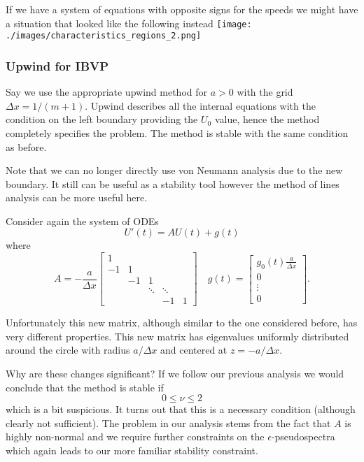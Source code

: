 \documentclass[11pt]{article}
\makeatletter
\def\maxwidth{\ifdim\Gin@nat@width>\linewidth\linewidth
    \else\Gin@nat@width\fi}
\let\Oldincludegraphics\includegraphics
\renewcommand{\includegraphics}[1]{\Oldincludegraphics[width=.8\maxwidth]{#1}}
\makeatother
\begin{document}
    If we have a system of equations with opposite signs for the speeds we
might have a situation that looked like the following instead
\texttt{[image: ./images/characteristics\_regions\_2.png]}

    \hypertarget{upwind-for-ibvp}{%
\subsubsection{Upwind for IBVP}\label{upwind-for-ibvp}}

Say we use the appropriate upwind method for \(a > 0\) with the grid
\(\Delta x = 1 / (m + 1)\). Upwind describes all the internal equations
with the condition on the left boundary providing the \(U_0\) value,
hence the method completely specifies the problem. The method is stable
with the same condition as before.

Note that we can no longer directly use von Neumann analysis due to the
new boundary. It still can be useful as a stability tool however the
method of lines analysis can be more useful here.

    Consider again the system of ODEs \[
    U'(t) = A U(t) + g(t)
\] where \[
    A = - \frac{a}{\Delta x} \begin{bmatrix}
        1 \\
        -1 & 1 \\
        & -1 & 1 \\
        & & \ddots & \ddots \\
        & & & -1 & 1
    \end{bmatrix} \quad g(t) = \begin{bmatrix} g_0(t) \frac{a}{\Delta x} \\ 0 \\ \vdots \\ 0 \end{bmatrix}.
\]

    Unfortunately this new matrix, although similar to the one considered
before, has very different properties. This new matrix has eigenvalues
uniformly distributed around the circle with radius \(a / \Delta x\) and
centered at \(z = - a / \Delta x\).

    Why are these changes significant? If we follow our previous analysis we
would conclude that the method is stable if \[
    0 \leq \nu \leq 2
\] which is a bit suspicious. It turns out that this is a necessary
condition (although clearly not sufficient). The problem in our analysis
stems from the fact that \(A\) is highly non-normal and we require
further constraints on the \(\epsilon\)-pseudospectra which again leads
to our more familiar stability constraint.
\end{document}
